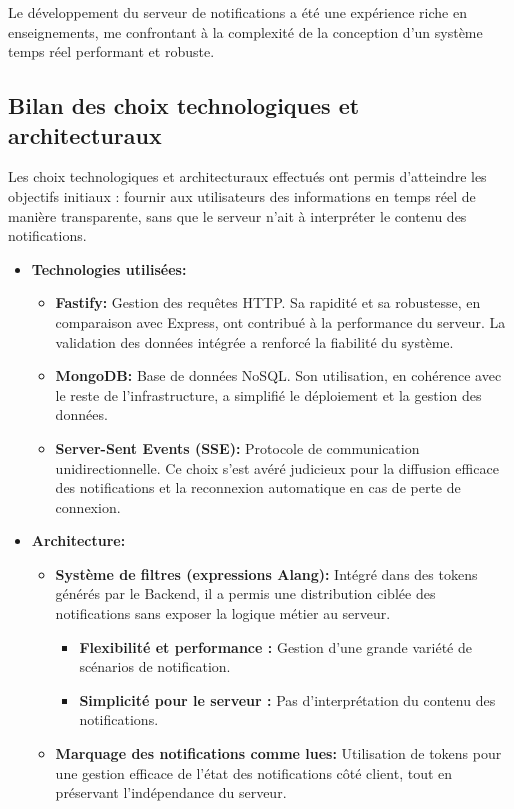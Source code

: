 
Le développement du serveur de notifications a été une expérience riche en enseignements, me confrontant à la complexité de la conception d'un système temps réel performant et robuste.

\subsection{Bilan des choix technologiques et architecturaux}

Les choix technologiques et architecturaux effectués ont permis d'atteindre les
objectifs initiaux : fournir aux utilisateurs des informations en temps réel
de manière transparente, sans que le serveur n'ait à interpréter le contenu
des notifications.

\begin{itemize}
\item {\bf Technologies utilisées:}
	\begin{itemize}
	    \item {\bf Fastify:} Gestion des requêtes HTTP. Sa rapidité et sa robustesse, en comparaison avec Express, ont contribué à la performance du serveur. La validation des données intégrée a renforcé la fiabilité du système.
	    \item {\bf MongoDB:} Base de données NoSQL. Son utilisation, en cohérence avec le reste de l'infrastructure, a simplifié le déploiement et la gestion des données.
	    \item {\bf Server-Sent Events (SSE):} Protocole de communication unidirectionnelle. Ce choix s'est avéré judicieux pour la diffusion efficace des notifications et la reconnexion automatique en cas de perte de connexion.
	\end{itemize}
\item {\bf Architecture:}
	\begin{itemize}
    \item {\bf Système de filtres (expressions Alang):} Intégré dans des tokens générés par le Backend, il a permis une distribution ciblée des notifications sans exposer la logique métier au serveur.
		\begin{itemize}
        \item {\bf Flexibilité et performance :} Gestion d'une grande variété de scénarios de notification.
        \item {\bf Simplicité pour le serveur :} Pas d'interprétation du contenu des notifications.
		\end{itemize}
    \item {\bf Marquage des notifications comme lues:} Utilisation de tokens pour une gestion efficace de l'état des notifications côté client, tout en préservant l'indépendance du serveur.
	\end{itemize}
\end{itemize}

